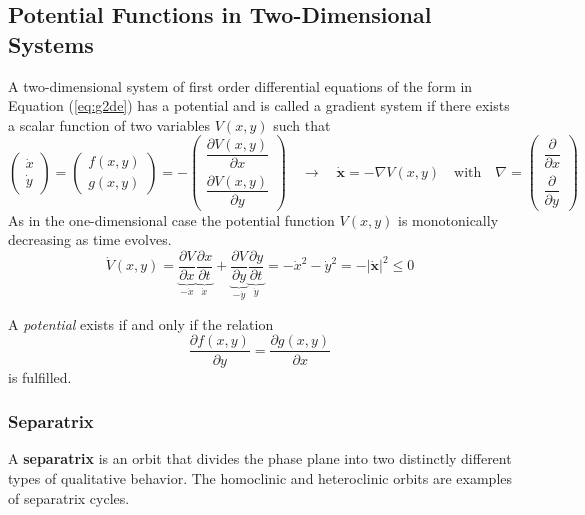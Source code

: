 \subsection{Potential Functions in Two-Dimensional Systems}{\label{sec:pf2d}}
A two-dimensional system of first order differential equations of the form in Equation (\ref{eq:g2de}) has a potential and is called a gradient system if there exists a scalar function of two variables $V(x,y)$ such that
\begin{equation}
	\begin{pmatrix}
		\dot{x}\\\dot{y}
	\end{pmatrix}=
	\begin{pmatrix}
		f(x,y)\\g(x,y)
	\end{pmatrix}=-
	\begin{pmatrix}
		\dfrac{\partial V(x,y)}{\partial x}\\[10pt]
		\dfrac{\partial V(x,y)}{\partial y}
	\end{pmatrix}\quad\rightarrow\quad
	\mathbf{\dot{x}}=-\nabla V(x,y)\quad\text{with}\quad\nabla=
	\begin{pmatrix}
		\dfrac{\partial}{\partial x}\\[10pt]
		\dfrac{\partial}{\partial y}
	\end{pmatrix}
\end{equation}
As in the one-dimensional case the potential function $V(x,y)$ is monotonically decreasing as time evolves.
\begin{equation}
	\dot{V}(x,y)=\underbrace{\frac{\partial V}{\partial x}}_{-\dot{x}}\underbrace{\frac{\partial x}{\partial t}}_{\dot{x}}+
	\underbrace{\frac{\partial V}{\partial y}}_{-\dot{y}}\underbrace{\frac{\partial y}{\partial t}}_{\dot{y}}=-\dot{x}^2-\dot{y}^2=-|\mathbf{\dot{x}}|^2\leq0
\end{equation}
\begin{theorem}
	A \emph{potential} exists if and only if the relation
	\begin{equation}
		\frac{\partial f(x,y)}{\partial y}=\frac{\partial g(x,y)}{\partial x}
	\end{equation}
	is fulfilled.
\end{theorem}
\subsubsection{Separatrix}
A \textbf{separatrix} is an orbit that divides the phase plane into two distinctly different types of qualitative behavior.
The homoclinic and heteroclinic orbits are examples of separatrix cycles.
